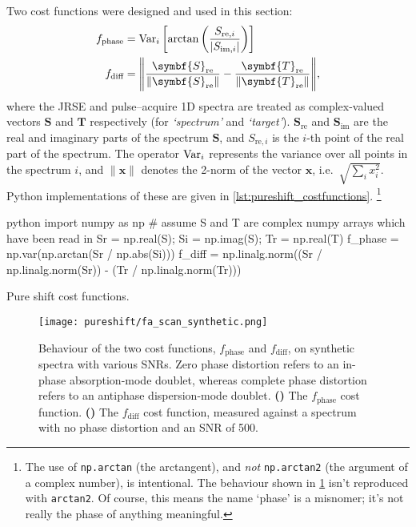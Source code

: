Two cost functions were designed and used in this section:
\begin{align}
    f_\text{phase} &= \Var_i\left[\arctan\left(\frac{S_{\text{re},i}}{|S_{\text{im},i}|}\right)\right] \label{eq:ps_cf_phase} \\
    f_\text{diff} &= \Biggl\lVert \frac{\symbf{S}_\text{re}}{\lVert \symbf{S}_\text{re} \rVert} - \frac{\symbf{T}_\text{re}}{\lVert \symbf{T}_\text{re} \rVert} \Biggr\rVert, \label{eq:ps_cf_diff}
\end{align}
where the JRSE and pulse--acquire 1D spectra are treated as complex-valued vectors $\symbf{S}$ and $\symbf{T}$ respectively (for \textit{`spectrum'} and \textit{`target'}). $\symbf{S}_\text{re}$ and $\symbf{S}_\text{im}$ are the real and imaginary parts of the spectrum $\symbf{S}$, and $S_{\text{re},i}$ is the $i$-th point of the real part of the spectrum.
The operator $\operatorname{Var}_i$ represents the variance over all points in the spectrum $i$, and $\lVert \symbf{x} \rVert$ denotes the 2-norm of the vector $\symbf{x}$, i.e.\ $\sqrt{\sum_i x_i^2}$.
Python implementations of these are given in \cref{lst:pureshift_costfunctions}.%
\footnote{The use of \texttt{np.arctan} (the arctangent), and \textit{not} \texttt{np.arctan2} (the argument of a complex number), is intentional. The behaviour shown in \cref{fig:fa_scan_synthetic} isn't reproduced with \texttt{arctan2}. Of course, this means the name `phase' is a misnomer; it's not really the phase of anything meaningful.}

\begin{mylisting}[htb]
\begin{tcbminted}{python}
import numpy as np
# assume S and T are complex numpy arrays which have been read in
Sr = np.real(S); Si = np.imag(S); Tr = np.real(T)
f_phase = np.var(np.arctan(Sr / np.abs(Si)))
f_diff = np.linalg.norm((Sr / np.linalg.norm(Sr))
                        - (Tr / np.linalg.norm(Tr)))
\end{tcbminted}
    \caption[Pure shift cost functions]{Pure shift cost functions.}
    \label{lst:pureshift_costfunctions}
\end{mylisting}

\begin{figure}[htb]
    \centering
    \texttt{[image: pureshift/fa\_scan\_synthetic.png]}
    {\label{fig:fa_scan_synthetic_fphase}}
    {\label{fig:fa_scan_synthetic_fdiff}}
    \caption[Evaluation of $f_\text{phase}$ and $f_\text{diff}$ cost functions on synthetic data]{
        Behaviour of the two cost functions, $f_\text{phase}$ and $f_\text{diff}$, on synthetic spectra with various SNRs.
        Zero phase distortion refers to an in-phase absorption-mode doublet, whereas complete phase distortion refers to an antiphase dispersion-mode doublet.
        \textbf{()} The $f_\text{phase}$ cost function.
        \textbf{()} The $f_\text{diff}$ cost function, measured against a spectrum with no phase distortion and an SNR of 500.
    }
    \label{fig:fa_scan_synthetic}
\end{figure}

